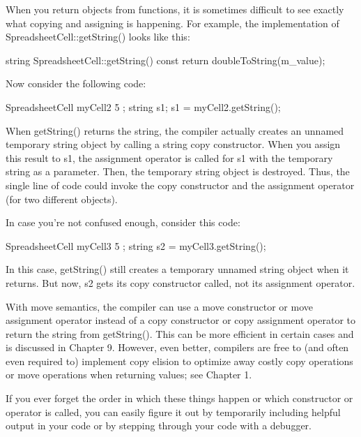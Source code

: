 
When you return objects from functions, it is sometimes difficult to see exactly what copying and assigning is happening. For example, the implementation of SpreadsheetCell::getString() looks like this:

\begin{cpp}
string SpreadsheetCell::getString() const
{
    return doubleToString(m_value);
}
\end{cpp}

Now consider the following code:

\begin{cpp}
SpreadsheetCell myCell2 { 5 };
string s1;
s1 = myCell2.getString();
\end{cpp}

When getString() returns the string, the compiler actually creates an unnamed temporary string object by calling a string copy constructor. When you assign this result to s1, the assignment operator is called for s1 with the temporary string as a parameter. Then, the temporary string object is destroyed. Thus, the single line of code could invoke the copy constructor and the assignment operator (for two different objects).

In case you’re not confused enough, consider this code:

\begin{cpp}
SpreadsheetCell myCell3 { 5 };
string s2 = myCell3.getString();
\end{cpp}

In this case, getString() still creates a temporary unnamed string object when it returns. But now, s2 gets its copy constructor called, not its assignment operator.

With move semantics, the compiler can use a move constructor or move assignment operator instead of a copy constructor or copy assignment operator to return the string from getString(). This can be more efficient in certain cases and is discussed in Chapter 9. However, even better, compilers are free to (and often even required to) implement copy elision to optimize away costly copy operations or move operations when returning values; see Chapter 1.

If you ever forget the order in which these things happen or which constructor or operator is called, you can easily figure it out by temporarily including helpful output in your code or by stepping through your code with a debugger.


